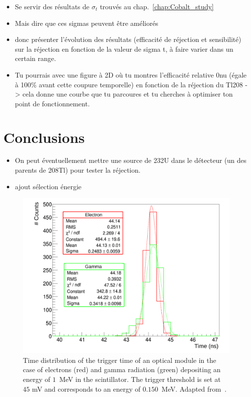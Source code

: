 \begin{itemize}
\item Se servir des résultats de $\sigma_{t}$ trouvés au chap.~\ref{chap:Cobalt_study}
\item Mais dire que ces sigmas peuvent être améliorés
\item donc présenter l'évolution des résultats (efficacité de réjection et sensibilité) sur la réjection en fonction de la valeur de sigma t, à faire varier dans un certain range.
\item Tu pourrais avec une figure à 2D où tu montres l'efficacité relative 0nu (égale à 100\% avant cette coupure temporelle) en fonction de la réjection du Tl208 -> cela donne une courbe que tu parcoures et tu cherches à optimiser ton point de fonctionnement.
\end{itemize}


\section{Conclusions}

\begin{itemize}
\item On peut éventuellement mettre une source de 232U dans le détecteur (un des parents de 208Tl) pour tester la réjection.
\item ajout sélection énergie
\end{itemize}


\begin{figure}
  \centering
  \includegraphics[width=13cm]{timedifference/fig_timediff/Arnaud_RMS_PM.pdf}
  \caption{Time distribution of the trigger time of an optical module in the case of electrons (red) and gamma radiation (green) depositing an energy of $1$~MeV in the scintillator.
    The trigger threshold is set at $45$ mV and corresponds to an energy of $0.150$~MeV.
    Adapted from~\cite{HuberThesis}.
  \label{fig:Arnaud_RMS_PM}}
\end{figure}
